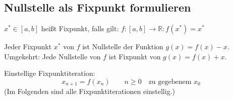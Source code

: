 \subsection{Nullstelle als Fixpunkt formulieren}

\begin{definition}
	$x^* \in [a, b]$ heißt Fixpunkt, falls gilt: $f: [a, b] \rightarrow \mathbb{R}: f(x^*) = x^*$
\end{definition}
\begin{lemma}
	Jeder Fixpunkt $x^*$ von $f$ ist Nullstelle der Funktion $g(x) = f(x) - x$. \\
	Umgekehrt: Jede Nullstelle von $f$ ist Fixpunkt von $g(x) = f(x) + x$.
\end{lemma}
\begin{definition}
	Einstellige Fixpunktiteration:
	\begin{equation*}
		x_{n + 1} = f(x_n) \qquad n \geq 0 \quad \text{zu gegebenem $x_0$}
	\end{equation*}
	(Im Folgenden sind alle Fixpunktiterationen einstellig.)
\end{definition}

